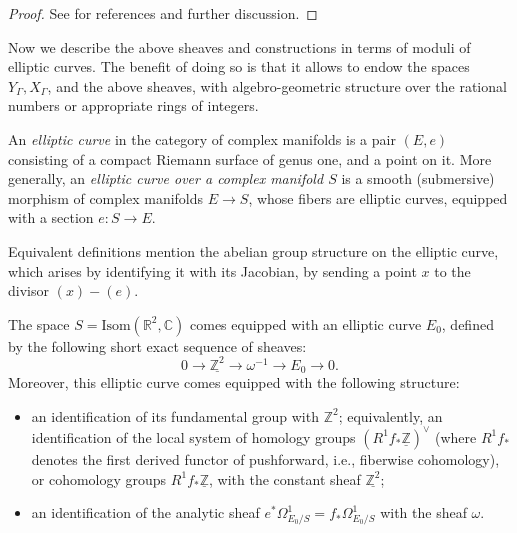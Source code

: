 \begin{proof}
 See \cite{Deligne-formes-modulaires} for references and further discussion.
\end{proof}

\medskip

Now we describe the above sheaves and constructions in terms of moduli of elliptic curves. The benefit of doing so is that it allows to endow the spaces $Y_\Gamma, X_\Gamma$, and the above sheaves, with algebro-geometric structure over the rational numbers or appropriate rings of integers. 

\begin{definition}
 \label{definition-elliptic-curve-analytic}
An {\it elliptic curve} in the category of complex manifolds is a pair $(E,e)$ consisting of a compact Riemann surface of genus one, and a point on it. More generally, an {\it elliptic curve over a complex manifold $S$} is a smooth (submersive) morphism of complex manifolds $E\to S$, whose fibers are elliptic curves, equipped with a section $e:S\to E$.
\end{definition}

Equivalent definitions mention the abelian group structure on the elliptic curve, which arises by identifying it with its Jacobian, by sending a point $x$ to the divisor $(x)-(e)$. 

The space $S=\text{Isom}(\mathbb R^2,\mathbb C)$ comes equipped with an elliptic curve $E_0$, defined by the following short exact sequence of sheaves:
$$ 0 \to \underline{\mathbb Z^2} \to \omega^{-1} \to E_0 \to 0.$$
Moreover, this elliptic curve comes equipped with the following structure:
\begin{itemize}
 \item an identification of its fundamental group with $\mathbb Z^2$; equivalently, an identification of the local system of homology groups $(R^1 f_* \underline{\mathbb Z})^\vee$ (where $R^1 f_*$ denotes the first derived functor of pushforward, i.e., fiberwise cohomology), or cohomology groups $R^1 f_* \underline{\mathbb Z}$, with the constant sheaf $\underline{\mathbb Z^2}$;
 \item an identification of the analytic sheaf $e^*\Omega_{E_0/S}^1 = f_*\Omega_{E_0/S}^1$ with the sheaf $\omega$. 
\end{itemize}





